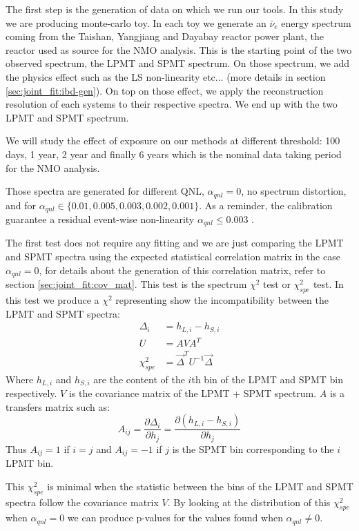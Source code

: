\documentclass[../main.tex]{subfiles}
\begin{document}
The first step is the generation of data on which we run our tools. In this study we are producing monte-carlo toy. In each toy we generate an $\bar{\nu}_e$ energy spectrum coming from the Taishan, Yangjiang and Dayabay reactor power plant, the reactor used as source for the NMO analysis. This is the starting point of the two observed spectrum, the LPMT and SPMT spectrum. On those spectrum, we add the physics effect such as the LS non-linearity etc... (more details in section \ref{sec:joint_fit:ibd-gen}). On top on those effect, we apply the reconstruction resolution of each systems to their respective spectra. We end up with the two LPMT and SPMT spectrum.

We will study the effect of exposure on our methods at different threshold: 100 days, 1 year, 2 year and finally 6 years which is the nominal data taking period for the NMO analysis.

Those spectra are generated for different QNL, $\alpha_{qnl} = 0$, no spectrum distortion, and for $\alpha_{qnl} \in \{0.01, 0.005, 0.003, 0.002, 0.001\}$. As a reminder, the calibration guarantee a residual event-wise non-linearity $\alpha_{qnl} \leq 0.003$ \cite{juno_collaboration_calibration_2021}.

The first test does not require any fitting and we are just comparing the LPMT and SPMT spectra using the expected statistical correlation matrix in the case $\alpha_{qnl} = 0$, for details about the generation of this correlation matrix, refer to section \ref{sec:joint_fit:cov_mat}. This test is the spectrum $\chi^2$ test or $\chi^2_{spe}$ test. In this test we produce a $\chi^2$ representing show the incompatibility between the LPMT and SPMT spectra:
\begin{align}
  \Delta_i &= h_{L,i} - h_{S,i} \\
  U &= A V A^T \\
  \chi^2_{spe} &= \vec{\Delta}^T U^{-1} \vec{\Delta}
\end{align}
Where $h_{L,i}$ and $h_{S,i}$ are the content of the $i$th bin of the LPMT and SPMT bin respectively. $V$ is the covariance matrix of the LPMT + SPMT spectrum. $A$ is a transfers matrix such as:
\begin{equation}
  A_{ij} = \frac{\partial \Delta_i}{\partial h_j} = \frac{\partial(h_{L, i} - h_{S, i})}{\partial h_j}
\end{equation}
Thus $A_{ij} = 1$ if $i = j$ and $A_{ij} = -1$ if $j$ is the SPMT bin corresponding to the $i$ LPMT bin.

This $\chi^2_{spe}$ is minimal when the statistic between the bins of the LPMT and SPMT spectra follow the covariance matrix $V$. By looking at the distribution of this $\chi^2_{spe}$ when $\alpha_{qnl} = 0$ we can produce p-values for the values found when $\alpha_{qnl} \neq 0$.
\end{document}
